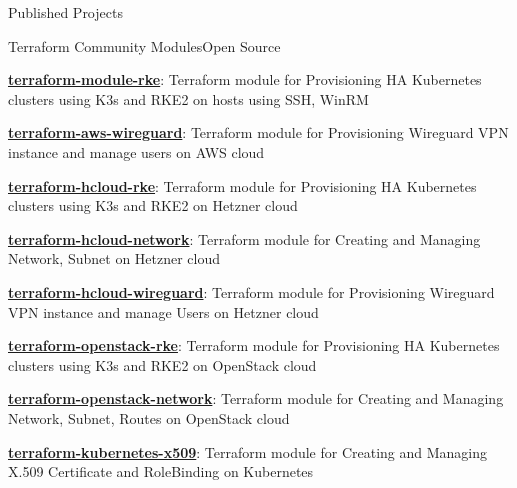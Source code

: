 \documentclass[]{main}
\begin{document}
\begin{section}{Published Projects}
    \begin{subsection}{Terraform Community Modules}{Open Source}{}{}
        \item \href{https://github.com/cktf/terraform-module-rke}{\textbf{terraform-module-rke}}: Terraform module for Provisioning HA Kubernetes clusters using K3s and RKE2 on hosts using SSH, WinRM \;\href{https://github.com/cktf/terraform-module-rke}{\faExternalLink*}
        \item \href{https://github.com/cktf/terraform-aws-wireguard}{\textbf{terraform-aws-wireguard}}: Terraform module for Provisioning Wireguard VPN instance and manage users on AWS cloud \;\href{https://github.com/cktf/terraform-aws-wireguard}{\faExternalLink*}
        \item \href{https://github.com/cktf/terraform-hcloud-rke}{\textbf{terraform-hcloud-rke}}: Terraform module for Provisioning HA Kubernetes clusters using K3s and RKE2 on Hetzner cloud \;\href{https://github.com/cktf/terraform-hcloud-rke}{\faExternalLink*}
        \item \href{https://github.com/cktf/terraform-hcloud-network}{\textbf{terraform-hcloud-network}}: Terraform module for Creating and Managing Network, Subnet on Hetzner cloud \;\href{https://github.com/cktf/terraform-hcloud-network}{\faExternalLink*}
        \item \href{https://github.com/cktf/terraform-hcloud-wireguard}{\textbf{terraform-hcloud-wireguard}}: Terraform module for Provisioning Wireguard VPN instance and manage Users on Hetzner cloud \;\href{https://github.com/cktf/terraform-hcloud-wireguard}{\faExternalLink*}
        \item \href{https://github.com/cktf/terraform-openstack-rke}{\textbf{terraform-openstack-rke}}: Terraform module for Provisioning HA Kubernetes clusters using K3s and RKE2 on OpenStack cloud \;\href{https://github.com/cktf/terraform-openstack-rke}{\faExternalLink*}
        \item \href{https://github.com/cktf/terraform-openstack-network}{\textbf{terraform-openstack-network}}: Terraform module for Creating and Managing Network, Subnet, Routes on OpenStack cloud \;\href{https://github.com/cktf/terraform-openstack-network}{\faExternalLink*}
        \item \href{https://github.com/cktf/terraform-kubernetes-x509}{\textbf{terraform-kubernetes-x509}}: Terraform module for Creating and Managing X.509 Certificate and RoleBinding on Kubernetes \;\href{https://github.com/cktf/terraform-kubernetes-x509}{\faExternalLink*}

\end{subsection}
\end{section}
\end{document}

